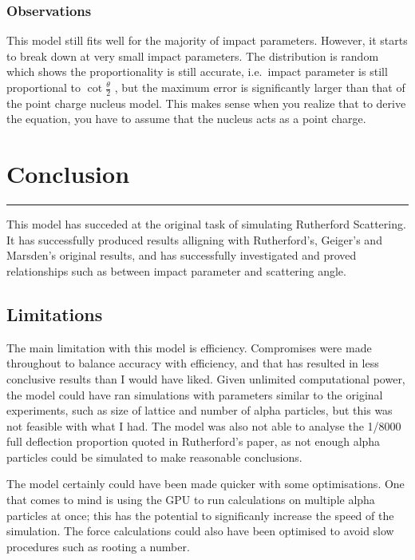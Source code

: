 \documentclass[11pt]{article}
\begin{document}
    \hypertarget{observations}{%
\subsubsection*{Observations}\label{observations}}

This model still fits well for the majority of impact parameters.
However, it starts to break down at very small impact parameters. The
distribution is random which shows the proportionality is still
accurate, i.e.~impact parameter is still proportional to
\(\cot\frac{\theta}{2}\) , but the maximum error is significantly larger
than that of the point charge nucleus model. This makes sense when you
realize that to derive the equation, you have to assume that the nucleus
acts as a point charge.

    \hypertarget{conclusion}{%
\section{Conclusion}\label{conclusion}}

\begin{center}\rule{0.5\linewidth}{0.5pt}\end{center}

This model has succeded at the original task of simulating Rutherford
Scattering. It has successfully produced results alligning with
Rutherford's, Geiger's and Marsden's original results, and has
successfully investigated and proved relationships such as between
impact parameter and scattering angle.

\hypertarget{limitations}{%
\subsection{Limitations}\label{limitations}}

The main limitation with this model is efficiency. Compromises were made
throughout to balance accuracy with efficiency, and that has resulted in
less conclusive results than I would have liked. Given unlimited
computational power, the model could have ran simulations with
parameters similar to the original experiments, such as size of lattice
and number of alpha particles, but this was not feasible with what I
had. The model was also not able to analyse the 1/8000 full deflection
proportion quoted in Rutherford's paper, as not enough alpha particles
could be simulated to make reasonable conclusions.

The model certainly could have been made quicker with some
optimisations. One that comes to mind is using the GPU to run
calculations on multiple alpha particles at once; this has the potential
to significanly increase the speed of the simulation. The force
calculations could also have been optimised to avoid slow procedures
such as rooting a number.
\end{document}
